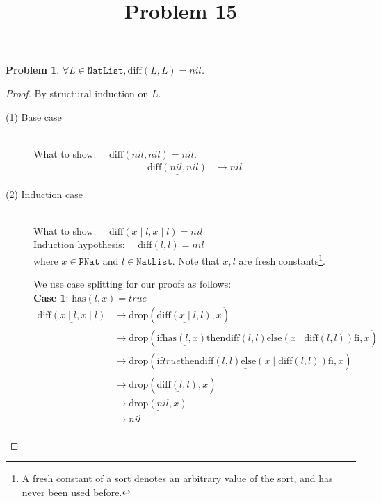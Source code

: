 \documentclass[12pt, a4paper]{article}
\title{Problem 15}
\date{\vspace{-5ex}}
\newtheorem{problem}{Problem}
\newcommand{\rel}[1]{\mathrel{#1}}
\newcommand{\rmx}[1]{\mathrm{#1}}
\newcommand{\larrow}{\longrightarrow}
\newcommand{\under}{\underline}
\begin{document}
\maketitle

\begin{problem}
$\forall L \in \mathtt{NatList}, \rmx{diff}(L, L) = nil$.
\end{problem}
\begin{proof}
By structural induction on $L$.
\begin{description}
\item[(1) Base case]~\\
\noindent
What to show: $\quad \rmx{diff}(nil, nil) = nil$.
\begin{align*}
\under{\rmx{diff}(nil, nil)}
	&\larrow nil \tag{by diff1}
\end{align*}

\item[(2) Induction case]~\\
What to show: $\quad \rmx{diff}(x \mid l, x \mid l) = nil$ \\
Induction hypothesis: $\quad \rmx{diff}(l, l) = nil$  \\
where $x \in \mathtt{PNat}$ and $l \in \mathtt{NatList}$.
Note that $x, l$ are fresh constants\footnote{A fresh constant of a sort denotes an arbitrary value of the sort, and has never been used before.}.

We use case splitting for our proofs as follows: \\
\textbf{Case 1}: $\rmx{has}(l, x) = true$
\begin{align*}
\under{\rmx{diff}(x \mid l, x \mid l)}
	&\larrow \rmx{drop}(\under{\rmx{diff}(x \mid l, l)}, x) \tag{by Problem 14} \\
	&\larrow \rmx{drop}(\rel{\rmx{if}} \under{\rmx{has}(l, x)} \rel{\rmx{then}} \rmx{diff}(l, l) \rel{\rmx{else}} (x \mid \rmx{diff}(l, l)) \rel{\rmx{fi}}, x) \tag{by diff2} \\
	&\larrow \rmx{drop}(\under{\rel{\rmx{if}} true \rel{\rmx{then}} \rmx{diff}(l, l) \rel{\rmx{else}} (x \mid \rmx{diff}(l, l)) \rel{\rmx{fi}}}, x) \tag{by case splitting} \\
	&\larrow \rmx{drop}(\under{\rmx{diff}(l, l)}, x) \tag{by if1} \\
	&\larrow \under{\rmx{drop}(nil, x)} \tag{by IH} \\
	&\larrow nil \tag{by drop1} \\
\end{align*}


\end{description}
\end{proof}
\end{document}
